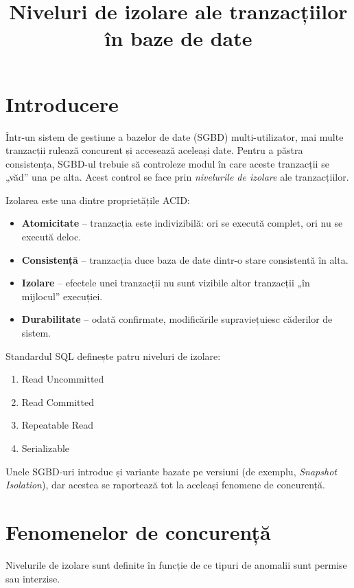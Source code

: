 \documentclass[11pt,a4paper]{article}
\title{Niveluri de izolare ale tranzacțiilor în baze de date}
\author{}
\date{}
\begin{document}
\maketitle

\section{Introducere}

Într-un sistem de gestiune a bazelor de date (SGBD) multi-utilizator, mai multe tranzacții rulează concurent și accesează aceleași date. Pentru a păstra consistența, SGBD-ul trebuie să controleze modul în care aceste tranzacții se „văd” una pe alta. Acest control se face prin \emph{nivelurile de izolare} ale tranzacțiilor.

Izolarea este una dintre proprietățile ACID:
\begin{itemize}[leftmargin=1.5cm]
  \item \textbf{Atomicitate} -- tranzacția este indivizibilă: ori se execută complet, ori nu se execută deloc.
  \item \textbf{Consistență} -- tranzacția duce baza de date dintr-o stare consistentă în alta.
  \item \textbf{Izolare} -- efectele unei tranzacții nu sunt vizibile altor tranzacții „în mijlocul” execuției.
  \item \textbf{Durabilitate} -- odată confirmate, modificările supraviețuiesc căderilor de sistem.
\end{itemize}

Standardul SQL definește patru niveluri de izolare:
\begin{enumerate}[leftmargin=1.5cm]
  \item Read Uncommitted
  \item Read Committed
  \item Repeatable Read
  \item Serializable
\end{enumerate}

Unele SGBD-uri introduc și variante bazate pe versiuni (de exemplu, \emph{Snapshot Isolation}), dar acestea se raportează tot la aceleași fenomene de concurență.

\section{Fenomenelor de concurență}

Nivelurile de izolare sunt definite în funcție de ce tipuri de anomalii sunt permise sau interzise.
\end{document}
